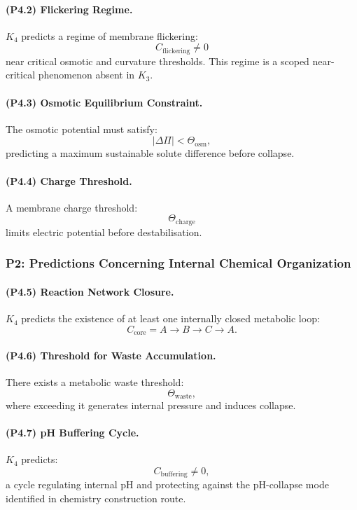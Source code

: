 \paragraph{(P4.2) Flickering Regime.}
$K_4$ predicts a regime of membrane flickering:
\[
C_{\mathrm{flickering}} \neq 0
\]
near critical osmotic and curvature thresholds.  
This regime is a scoped near-critical phenomenon absent in $K_3$.

\paragraph{(P4.3) Osmotic Equilibrium Constraint.}
The osmotic potential must satisfy:
\[
|\Delta \Pi| < \Theta_{\mathrm{osm}},
\]
predicting a maximum sustainable solute difference before collapse.

\paragraph{(P4.4) Charge Threshold.}
A membrane charge threshold:
\[
\Theta_{\mathrm{charge}}
\]
limits electric potential before destabilisation.

\subsubsection{P2: Predictions Concerning Internal Chemical Organization}

\paragraph{(P4.5) Reaction Network Closure.}
$K_4$ predicts the existence of at least one internally closed metabolic loop:
\[
C_{\mathrm{core}} = A \to B \to C \to A.
\]

\paragraph{(P4.6) Threshold for Waste Accumulation.}
There exists a metabolic waste threshold:
\[
\Theta_{\mathrm{waste}},
\]
where exceeding it generates internal pressure and induces collapse.

\paragraph{(P4.7) pH Buffering Cycle.}
$K_4$ predicts:
\[
C_{\mathrm{buffering}} \neq 0,
\]
a cycle regulating internal pH and protecting against the pH-collapse mode
identified in chemistry construction route.

